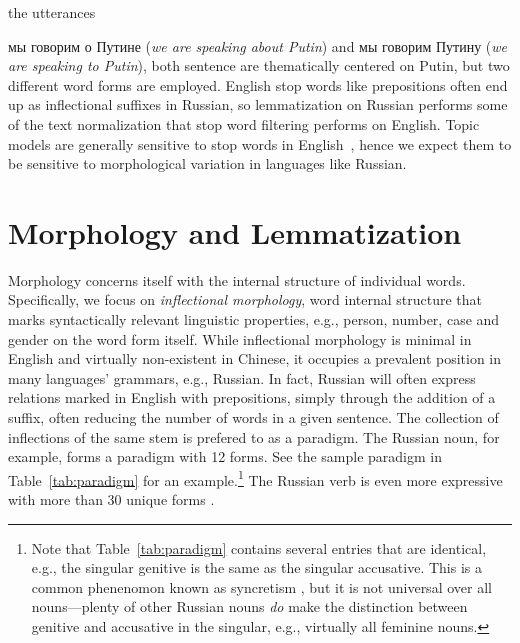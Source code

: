 \documentclass[11pt,letterpaper]{article}
\newcommand{\Note}[3]{\sethlcolor{#2}\hl{[\textbf{#1}: #3]}}
\renewcommand{\Note}[3]{}
\newcommand{\ryan}[1]{\Note{ryan}{lightorange}{#1}}
\newcommand{\chandler}[1]{\Note{chandler}{pink}{#1}}
\begin{document}
the utterances {{мы говорим о Путине} ({\em we
    are speaking about Putin}) and {{мы
      говорим Путину} ({\em we are speaking to Putin})}, both sentence
  are thematically centered on Putin, but two different word forms
  are employed.
English stop words like prepositions often end up as inflectional
suffixes in Russian, so lemmatization on Russian performs some
of the text normalization that stop word filtering performs on English.
Topic models are generally sensitive to stop
words in English~\cite{wallach2009,blei2010,eisenstein2011}, hence we
expect them to be sensitive to morphological variation in languages
like Russian.

  \ryan{Make connection here to stop words. We filter stop words (or try to) in topic models, so we should
    filter these endings as well?}
\chandler{I don't understand, what is the connection to stop words?}
\ryan{English stop words like prepositions are often inflectional suffixes in Russian. In a sense, lemmatization is analogus to filtering stop words. Consider
the Putin example: ``to'' is a stop word, but that is fully expressed by a suffix in Russian.}
\chandler{oooh, okay.  I modified this paragraph and in particular
    repurposed your comment at the end of the
    paragraph, change as desired.  I think this addresses your initial
    question (for the sake of the paper).}

\section{Morphology and Lemmatization}\label{sec:inflectional}

Morphology concerns itself with the internal structure of individual
words.  Specifically, we focus on {\em inflectional morphology}, word
internal structure that marks syntactically relevant linguistic
properties, e.g., person, number, case and gender on the word form
itself. While inflectional morphology is minimal in English and
virtually non-existent in Chinese, it occupies a prevalent position in
many languages' grammars, e.g., Russian. In fact, Russian will often
express relations marked in English with prepositions, simply through
the addition of a suffix, often reducing the number of words in a
given sentence. The collection of inflections of the same stem is prefered to as a
paradigm.  The Russian noun, for example, forms a paradigm with 12
forms.  See the sample paradigm in Table~\ref{tab:paradigm} for an
example.\footnote{Note that Table~\ref{tab:paradigm} contains several
  entries that are identical, e.g., the singular genitive is the same
  as the singular accusative. This is a common phenenomon known as
  syncretism \cite{baerman2005syntax}, but it is not universal over all nouns---plenty of other
  Russian nouns {\em do} make the distinction between
  genitive and accusative in the singular, e.g., virtually all
  feminine nouns.} The Russian verb is even more expressive with more
than 30 unique forms \cite{wade2010comprehensive}.

}
\end{document}
